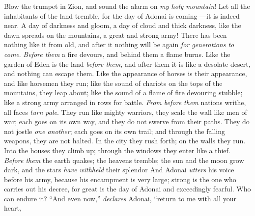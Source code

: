 \begin{biblechapter} %
 Blow the trumpet in Zion, 
and sound the alarm on \textit{my holy mountain}! 
Let all the inhabitants of the land tremble, 
for the day of Adonai is coming 
—it is indeed near.
\verse A day of darkness and gloom, 
a day of cloud and thick darkness, 
like the dawn spreads on the mountains, 
a great and strong army! 
There has been nothing like it from old, 
and after it nothing will be again \textit{for generations to come}.
\verse \textit{Before them} a fire devours, 
and behind them a flame burns. 
Like the garden of Eden is the land \textit{before them}, 
and after them it is like a desolate desert, 
and nothing can escape them.
\verse Like the appearance of horses is their appearance, 
and like horsemen they run;
\verse like the sound of chariots on the tops of the mountains, they leap about; 
like the sound of a flame of fire 
devouring stubble; 
like a strong army arranged 
in rows for battle.
\verse \textit{From before them} nations writhe, 
all faces \textit{turn pale}.
\verse They run like mighty warriors, 
they scale the wall like men of war; 
each goes on its own way, 
and they do not swerve from their paths.
\verse They do not jostle \textit{one another}; 
each goes on its own trail; 
and through the falling weapons, 
they are not halted.
\verse In the city they rush forth; 
on the walls they run. 
Into the houses they climb up; 
through the windows 
they enter like a thief.
\verse \textit{Before them} the earth quakes; 
the heavens tremble; 
the sun and the moon grow dark, 
and the stars \textit{have withheld} their splendor
\verse And Adonai \textit{utters} his voice before his army, 
because his encampment is very large; 
strong is the one who carries out his decree, 
for great is the day of Adonai 
and exceedingly fearful. 
Who can endure it?
 “And even now,” \textit{declares} Adonai, 
“return to me with all your heart, 

\end{biblechapter}
